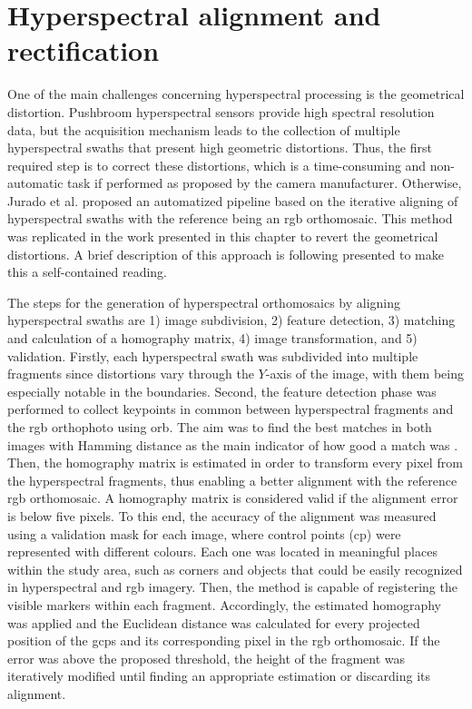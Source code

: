 \section{Hyperspectral alignment and rectification}

One of the main challenges concerning hyperspectral processing is the geometrical distortion. Pushbroom hyperspectral sensors provide high spectral resolution data, but the acquisition mechanism leads to the collection of multiple hyperspectral swaths that present high geometric distortions. Thus, the first required step is to correct these distortions, which is a time-consuming and non-automatic task if performed as proposed by the camera manufacturer. Otherwise, Jurado et al. \cite{jurado_efficient_2021} proposed an automatized pipeline based on the iterative aligning of hyperspectral swaths with the reference being an \acrshort{rgb} orthomosaic. This method was replicated in the work presented in this chapter to revert the geometrical distortions. A brief description of this approach is following presented to make this a self-contained reading.

The steps for the generation of hyperspectral orthomosaics by aligning hyperspectral swaths are 1) image subdivision, 2) feature detection, 3) matching and calculation of a homography matrix, 4) image transformation, and 5) validation. Firstly, each hyperspectral swath was subdivided into multiple fragments since distortions vary through the $Y$-axis of the image, with them being especially notable in the boundaries. Second, the feature detection phase was performed to collect keypoints in common between hyperspectral fragments and the \acrshort{rgb} orthophoto using \acrshort{orb}. The aim was to find the best matches in both images with Hamming distance as the main indicator of how good a match was \cite{norouzi_hamming_2012}. Then, the homography matrix is estimated in order to transform every pixel from the hyperspectral fragments, thus enabling a better alignment with the reference \acrshort{rgb} orthomosaic. A homography matrix is considered valid if the alignment error is below five pixels. To this end, the accuracy of the alignment was measured using a validation mask for each image, where control points (\acrshort{cp}) were represented with different colours. Each one was located in meaningful places within the study area, such as corners and objects that could be easily recognized in hyperspectral and \acrshort{rgb} imagery. Then, the method is capable of registering the visible markers within each fragment. Accordingly, the estimated homography was applied and the Euclidean distance was calculated for every projected position of the \acrshort{gcp}s and its corresponding pixel in the \acrshort{rgb} orthomosaic. If the error was above the proposed threshold, the height of the fragment was iteratively modified until finding an appropriate estimation or discarding its alignment.

